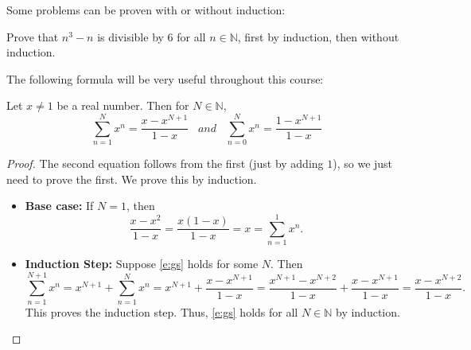 \documentclass[11pt,dvipsnames]{book}
\numberwithin{equation}{section} %
\numberwithin{figure}{section} %
\numberwithin{table}{section} %
\begin{document}
Some problems can be proven with or without induction:

\begin{exercise}
Prove that $n^{3}-n$ is divisible by $6$ for all $n\in\mathbb{N}$, first by induction, then without induction.
\end{exercise}



The following formula will be very useful throughout this course:

\begin{theorem}
Let $x\neq 1$ be a real number. Then for $N\in\mathbb{N}$, 
\begin{equation}
\label{e:gs}
\sum_{n=1}^{N} x^{n}=\frac{x-x^{N+1}}{1-x} \;\;\;and \;\;\;  \sum_{n=0}^{N} x^{n}=\frac{1-x^{N+1}}{1-x}
\end{equation}
\end{theorem}

\begin{proof}
The second equation follows from the first (just by adding $1$), so we just need to prove the first. We prove this by induction. 
\begin{itemize}
\item {\bf Base case:} If $N=1$, then
\[
 \frac{x-x^{2}}{1-x} = \frac{x(1-x)}{1-x}=x=\sum_{n=1}^{1} x^{n}.
 \]
 \item {\bf Induction Step:} Suppose \eqref{e:gs} holds for some $N$. Then
 \[
 \sum_{n=1}^{N+1} x^{n}
 =x^{N+1}+ \sum_{n=1}^{N} x^{n}
 =x^{N+1} + \frac{x-x^{N+1}}{1-x}
 =\frac{x^{N+1}-x^{N+2}}{1-x} + \frac{x-x^{N+1}}{1-x}
 =\frac{x-x^{N+2}}{1-x}.
 \]
 This proves the induction step. Thus, \eqref{e:gs} holds for all $N\in\mathbb{N}$ by induction.
 \end{itemize}
\end{proof}



% 
% 
%
\end{document}
